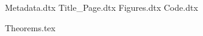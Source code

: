 
\ExplSyntaxOn
{Metadata.dtx}
{Title_Page.dtx}
{Figures.dtx}
{Code.dtx}
\ExplSyntaxOff

{Theorems.tex}
